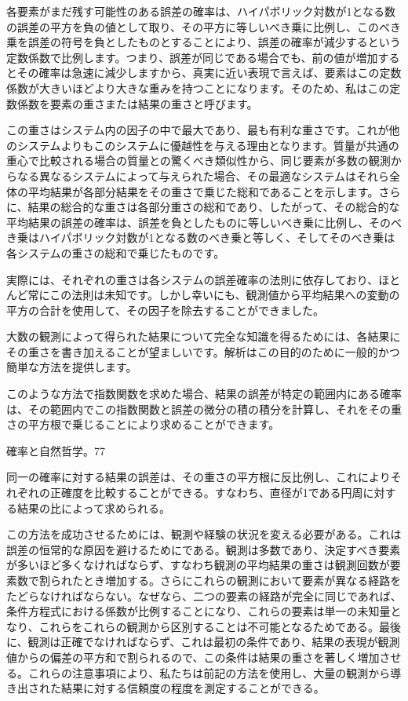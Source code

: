 \documentclass[a4paper,11pt,openany]{ltjsbook}
\begin{document}
各要素がまだ残す可能性のある誤差の確率は、ハイパボリック対数が1となる数の誤差の平方を負の値として取り、その平方に等しいべき乗に比例し、このべき乗を誤差の符号を負としたものとすることにより、誤差の確率が減少するという定数係数で比例します。つまり、誤差が同じである場合でも、前の値が増加するとその確率は急速に減少しますから、真実に近い表現で言えば、要素はこの定数係数が大きいほどより大きな重みを持つことになります。そのため、私はこの定数係数を要素の重さまたは結果の重さと呼びます。

この重さはシステム内の因子の中で最大であり、最も有利な重さです。これが他のシステムよりもこのシステムに優越性を与える理由となります。質量が共通の重心で比較される場合の質量との驚くべき類似性から、同じ要素が多数の観測からなる異なるシステムによって与えられた場合、その最適なシステムはそれら全体の平均結果が各部分結果をその重さで乗じた総和であることを示します。さらに、結果の総合的な重さは各部分重さの総和であり、したがって、その総合的な平均結果の誤差の確率は、誤差を負としたものに等しいべき乗に比例し、そのべき乗はハイパボリック対数が1となる数のべき乗と等しく、そしてそのべき乗は各システムの重さの総和で乗じたものです。

実際には、それぞれの重さは各システムの誤差確率の法則に依存しており、ほとんど常にこの法則は未知です。しかし幸いにも、観測値から平均結果への変動の平方の合計を使用して、その因子を除去することができました。

大数の観測によって得られた結果について完全な知識を得るためには、各結果にその重さを書き加えることが望ましいです。解析はこの目的のために一般的かつ簡単な方法を提供します。

このような方法で指数関数を求めた場合、結果の誤差が特定の範囲内にある確率は、その範囲内でこの指数関数と誤差の微分の積の積分を計算し、それをその重さの平方根で乗じることにより求めることができます。

確率と自然哲学。77

同一の確率に対する結果の誤差は、その重さの平方根に反比例し、これによりそれぞれの正確度を比較することができる。すなわち、直径が1である円周に対する結果の比によって求められる。

この方法を成功させるためには、観測や経験の状況を変える必要がある。これは誤差の恒常的な原因を避けるためにである。観測は多数であり、決定すべき要素が多いほど多くなければならず、すなわち観測の平均結果の重さは観測回数が要素数で割られたとき増加する。さらにこれらの観測において要素が異なる経路をたどらなければならない。なぜなら、二つの要素の経路が完全に同じであれば、条件方程式における係数が比例することになり、これらの要素は単一の未知量となり、これらをこれらの観測から区別することは不可能となるためである。最後に、観測は正確でなければならず、これは最初の条件であり、結果の表現が観測値からの偏差の平方和で割られるので、この条件は結果の重さを著しく増加させる。これらの注意事項により、私たちは前記の方法を使用し、大量の観測から導き出された結果に対する信頼度の程度を測定することができる。
\end{document}
